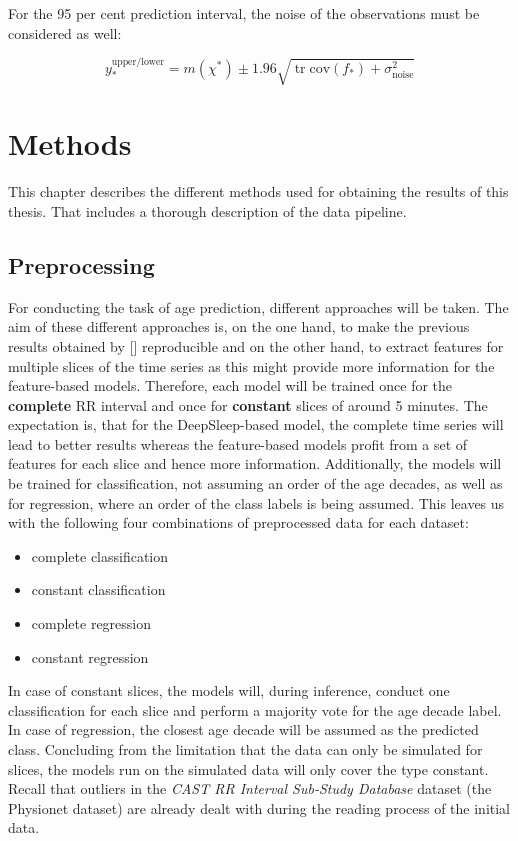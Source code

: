 \documentclass[11pt]{scrartcl}
\DeclareMathOperator{\tr}{tr}
\begin{document}
For the 95 per cent prediction interval, the noise of the observations must be considered as well:

\begin{equation}
   y_\ast^{\text{upper/lower}} = m(\chi^\ast) \pm 1.96 \sqrt{\tr \text{cov}(f_\ast) + \sigma^2_{\text{noise}}}
\end{equation}


\clearpage
\section{Methods}

This chapter describes the different methods used for obtaining the results of this thesis. That includes a thorough description of the data pipeline.

\subsection{Preprocessing}

For conducting the task of age prediction, different approaches will be taken. The aim of these different approaches is, on the one hand, to make the previous results obtained by [\cite{patternshrd}] reproducible and on the other hand, to extract features for multiple slices of the time series as this might provide more information for the feature-based models. Therefore, each model will be trained once for the \textbf{complete} RR interval and once for \textbf{constant} slices of around 5 minutes. The expectation is, that for the DeepSleep-based model, the complete time series will lead to better results whereas the feature-based models profit from a set of features for each slice and hence more information. Additionally, the models will be trained for classification, not assuming an order of the age decades, as well as for regression, where an order of the class labels is being assumed. This leaves us with the following four combinations of preprocessed data for each dataset:

\begin{itemize}
	\item complete classification
	\item constant classification
	\item complete regression
	\item constant regression
\end{itemize}

In case of constant slices, the models will, during inference, conduct one classification for each slice and perform a majority vote for the age decade label. In case of regression, the closest age decade will be assumed as the predicted class. Concluding from the limitation that the data can only be simulated for slices, the models run on the simulated data will only cover the type constant. Recall that outliers in the \textit{CAST RR Interval Sub-Study Database} dataset (the Physionet dataset) are already dealt with during the reading process of the initial data.
\end{document}
